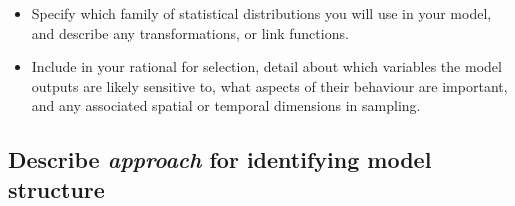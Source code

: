 \documentclass[
]{article}
\providecommand{\tightlist}{%
  \setlength{\itemsep}{0pt}\setlength{\parskip}{0pt}}
\begin{document}
\begin{tcolorbox}[enhanced jigsaw, opacitybacktitle=0.6, bottomrule=.15mm, leftrule=.75mm, rightrule=.15mm, colbacktitle=quarto-callout-caution-color!10!white, toprule=.15mm, titlerule=0mm, left=2mm, colframe=quarto-callout-caution-color-frame, breakable, title=\textcolor{quarto-callout-caution-color}{\faFire}\hspace{0.5em}{Preregistration Item}, opacityback=0, coltitle=black, bottomtitle=1mm, colback=white, toptitle=1mm, arc=.35mm]

\begin{itemize}
\tightlist
\item[$\square$]
  Specify which family of statistical distributions you will use in your
  model, and describe any transformations, or link functions.
\item[$\square$]
  Include in your rational for selection, detail about which variables
  the model outputs are likely sensitive to, what aspects of their
  behaviour are important, and any associated spatial or temporal
  dimensions in sampling.
\end{itemize}

\end{tcolorbox}

\subsection{\texorpdfstring{Describe \emph{approach} for identifying
model
structure}{Describe approach for identifying model structure}}\label{describe-approach-for-identifying-model-structure}
\end{document}
